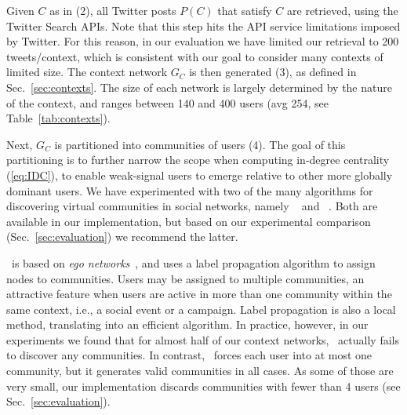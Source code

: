 %
Given $C$ as in (2), all Twitter posts $P(C)$ that satisfy $C$ are retrieved, using the Twitter Search APIs.
Note that this step hits the API service limitations imposed by Twitter. 
For this reason, in our evaluation we have limited our retrieval to 200 tweets/context, which is consistent with our goal to consider many contexts of limited size.
%
The context network $G_C$ is then generated (3), as defined in Sec.~\ref{sec:contexts}.  %
The size of each network is largely determined by the nature of the context, and  ranges between 140 and 400 users (avg 254, see Table~\ref{tab:contexts}).


Next, $G_C$  is partitioned into communities of users (4).
The goal of this partitioning is to further narrow the scope when computing in-degree centrality (\ref{eq:IDC}), 
to enable weak-signal users to emerge relative to other more globally dominant users.
%
We have experimented with two of the many algorithms for discovering virtual communities in social networks, namely \demon~\cite{Coscia:2012:DLD:2339530.2339630} and  \infomap~\cite{INFOMAP}. 
Both are available in our implementation, but based on our experimental comparison (Sec.~\ref{sec:evaluation}) we recommend the latter.

\demon~is based on \textit{ego networks}~\cite{Arnaboldi2013}, and uses a label propagation algorithm to assign nodes to communities.  
Users may be assigned to multiple communities, an attractive feature when users are active in more than one community within the same context, i.e., a social event or a campaign.
Label propagation is also a local method, translating into an efficient algorithm.
In practice, however, in our experiments we found that for almost half of our context networks, \demon~actually fails to discover any communities.
%
In contrast, \infomap~forces each user into at most one community, but it generates valid communities in all cases. 
As some of those are very small, our  implementation discards communities with fewer than 4 users (see Sec.~\ref{sec:evaluation}).
%

